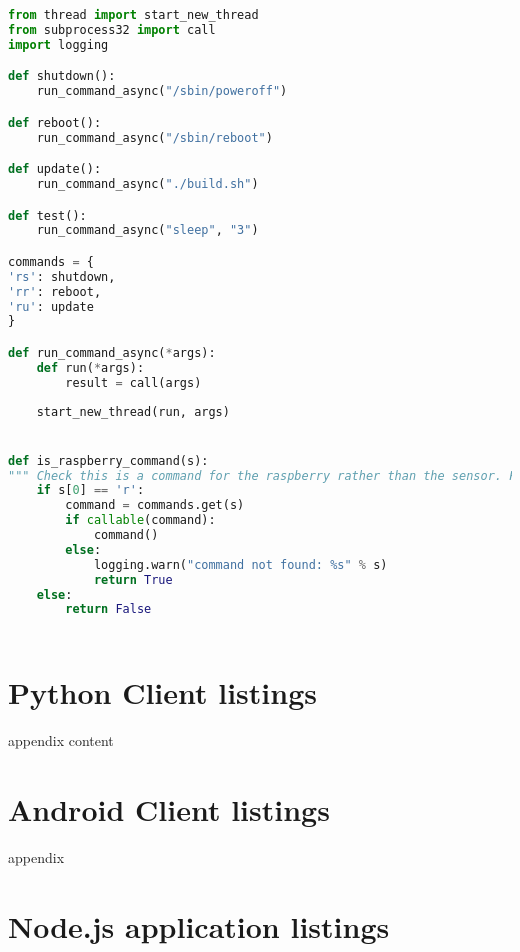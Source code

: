 \documentclass[hidelinks,11pt,a4paper,oneside,article]{memoir}
\begin{document}
\begin{lstlisting}[label={listing:rpi-subprocess},caption={Subprocess example},language=Python, style=styleprogramming]
from thread import start_new_thread
from subprocess32 import call
import logging

def shutdown():
    run_command_async("/sbin/poweroff")

def reboot():
    run_command_async("/sbin/reboot")

def update():
    run_command_async("./build.sh")

def test():
    run_command_async("sleep", "3")

commands = {
'rs': shutdown,
'rr': reboot,
'ru': update
}

def run_command_async(*args):
    def run(*args):
        result = call(args)
    
    start_new_thread(run, args)


def is_raspberry_command(s):
""" Check this is a command for the raspberry rather than the sensor. First letter must be an 'r'"""
    if s[0] == 'r':
        command = commands.get(s)
        if callable(command):
            command()
        else:
            logging.warn("command not found: %s" % s)
            return True
    else:
        return False



\end{lstlisting}\vspace{14pt}

\clearpage
{}
\chapter{Python Client listings}\label{appx:pythonclient}
appendix content
\clearpage
{}

\chapter{Android Client listings}\label{appx:androidclient}
appendix 
\clearpage
{}

\chapter{Node.js application listings}\label{appx:nodejsapp}
\end{document}
